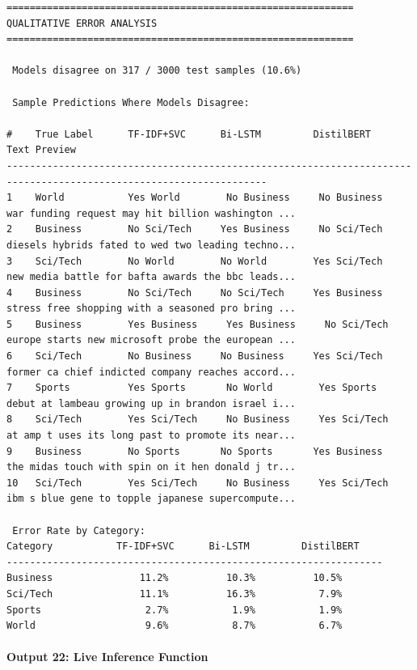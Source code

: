 \documentclass[12pt,a4paper,oneside]{report}
\begin{document}
\begin{Verbatim}[commandchars=\\\{\},breaklines=true,breakanywhere=true,fontsize=\scriptsize,frame=leftline,framesep=2mm,rulecolor=\color{gray}]
============================================================
QUALITATIVE ERROR ANALYSIS
============================================================

 Models disagree on 317 / 3000 test samples (10.6%)

 Sample Predictions Where Models Disagree:

#    True Label      TF-IDF+SVC      Bi-LSTM         DistilBERT      Text Preview
-------------------------------------------------------------------------------------------------------------------
1    World           Yes World        No Business     No Business     war funding request may hit billion washington ...
2    Business        No Sci/Tech     Yes Business     No Sci/Tech     diesels hybrids fated to wed two leading techno...
3    Sci/Tech        No World        No World        Yes Sci/Tech     new media battle for bafta awards the bbc leads...
4    Business        No Sci/Tech     No Sci/Tech     Yes Business     stress free shopping with a seasoned pro bring ...
5    Business        Yes Business     Yes Business     No Sci/Tech     europe starts new microsoft probe the european ...
6    Sci/Tech        No Business     No Business     Yes Sci/Tech     former ca chief indicted company reaches accord...
7    Sports          Yes Sports       No World        Yes Sports       debut at lambeau growing up in brandon israel i...
8    Sci/Tech        Yes Sci/Tech     No Business     Yes Sci/Tech     at amp t uses its long past to promote its near...
9    Business        No Sports       No Sports       Yes Business     the midas touch with spin on it hen donald j tr...
10   Sci/Tech        Yes Sci/Tech     No Business     Yes Sci/Tech     ibm s blue gene to topple japanese supercompute...

 Error Rate by Category:
Category           TF-IDF+SVC      Bi-LSTM         DistilBERT
-----------------------------------------------------------------
Business               11.2%          10.3%          10.5%
Sci/Tech               11.1%          16.3%           7.9%
Sports                  2.7%           1.9%           1.9%
World                   9.6%           8.7%           6.7%
\end{Verbatim}
\paragraph{Output 22: Live Inference Function}\mbox{}\\[-1ex]
\end{document}

